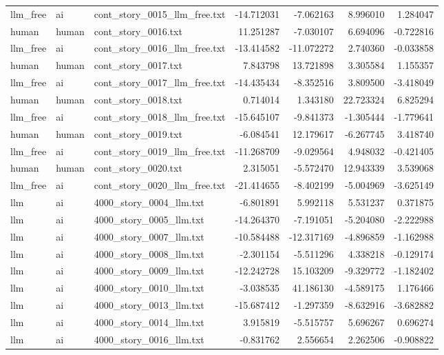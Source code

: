 \begin{longtable}{lllrrrr}
llm\_free & ai & cont\_story\_0015\_llm\_free.txt & -14.712031 & -7.062163 & 8.996010 & 1.284047 \\
human & human & cont\_story\_0016.txt & 11.251287 & -7.030107 & 6.694096 & -0.722816 \\
llm\_free & ai & cont\_story\_0016\_llm\_free.txt & -13.414582 & -11.072272 & 2.740360 & -0.033858 \\
human & human & cont\_story\_0017.txt & 7.843798 & 13.721898 & 3.305584 & 1.155357 \\
llm\_free & ai & cont\_story\_0017\_llm\_free.txt & -14.435434 & -8.352516 & 3.809500 & -3.418049 \\
human & human & cont\_story\_0018.txt & 0.714014 & 1.343180 & 22.723324 & 6.825294 \\
llm\_free & ai & cont\_story\_0018\_llm\_free.txt & -15.645107 & -9.841373 & -1.305444 & -1.779641 \\
human & human & cont\_story\_0019.txt & -6.084541 & 12.179617 & -6.267745 & 3.418740 \\
llm\_free & ai & cont\_story\_0019\_llm\_free.txt & -11.268709 & -9.029564 & 4.948032 & -0.421405 \\
human & human & cont\_story\_0020.txt & 2.315051 & -5.572470 & 12.943339 & 3.539068 \\
llm\_free & ai & cont\_story\_0020\_llm\_free.txt & -21.414655 & -8.402199 & -5.004969 & -3.625149 \\
llm & ai & 4000\_story\_0004\_llm.txt & -6.801891 & 5.992118 & 5.531237 & 0.371875 \\
llm & ai & 4000\_story\_0005\_llm.txt & -14.264370 & -7.191051 & -5.204080 & -2.222988 \\
llm & ai & 4000\_story\_0007\_llm.txt & -10.584488 & -12.317169 & -4.896859 & -1.162988 \\
llm & ai & 4000\_story\_0008\_llm.txt & -2.301154 & -5.511296 & 4.338218 & -0.129174 \\
llm & ai & 4000\_story\_0009\_llm.txt & -12.242728 & 15.103209 & -9.329772 & -1.182402 \\
llm & ai & 4000\_story\_0010\_llm.txt & -3.038535 & 41.186130 & -4.589175 & 1.176466 \\
llm & ai & 4000\_story\_0013\_llm.txt & -15.687412 & -1.297359 & -8.632916 & -3.682882 \\
llm & ai & 4000\_story\_0014\_llm.txt & 3.915819 & -5.515757 & 5.696267 & 0.696274 \\
llm & ai & 4000\_story\_0016\_llm.txt & -0.831762 & 2.556654 & 2.262506 & -0.908822 \\

\end{longtable}
